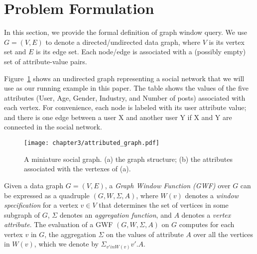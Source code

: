 \section{Problem Formulation}


In this section, we provide the formal definition of graph window query.
We use $G = (V,E)$ to denote a directed/undirected data graph, where $V$ is its vertex set and $E$ is its edge set.
Each node/edge is associated with a (possibly empty) set of attribute-value pairs.


Figure~\ref{fig:attributed} shows an undirected graph representing a social network that we will use as our running example in this paper. 
The table shows the values of the five attributes (User, Age, Gender, Industry, and Number of posts) associated with each vertex. For convenience, each node is labeled with its user attribute value;
and there is one edge between a user X and another user Y if X and Y are connected in the social network.


\begin{figure}[h]
\centering
\texttt{[image: chapter3/attributed\_graph.pdf]}
	\caption{A miniature social graph. (a) the graph structure; (b) the attributes associated with the vertexes of (a).} 
	\label{fig:attributed}
\end{figure}

Given a data graph $G = (V,E)$,
a \emph{Graph Window Function (GWF)} over $G$ can be expressed 
as a quadruple $(G, W, \Sigma, A)$, where 
$W(v)$ denotes a \emph{window specification} for a vertex $v \in V$ 
that determines the set of vertices in some subgraph of $G$,
$\Sigma$ denotes an \emph{aggregation function}, and $A$ denotes 
a \emph{vertex attribute}.
The evaluation of a GWF $(G, W, \Sigma, A)$ on $G$
computes for each vertex $v$ in $G$, the aggregation $\Sigma$ on the 
values of attribute $A$  
over all the vertices in $W(v)$, which we denote by $\Sigma_{v' in W(v)} v'.A$.

